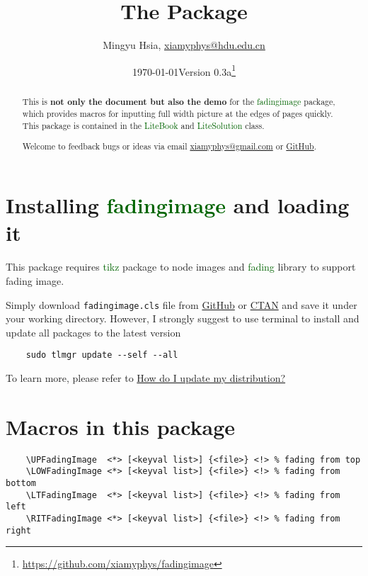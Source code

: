 \documentclass[11pt,svgnames]{article}
\title{\bfseries The \pkg{fadingimage} Package}
\author{Mingyu Hsia, \href{mailto:xiamyphys@hdu.edu.cn}{\ttfamily xiamyphys@hdu.edu.cn}}
\affil{Hangzhou Dianzi University}
\date{\today\quad Version 0.3a\thanks{\url{https://github.com/xiamyphys/fadingimage}}}
\def\pkg#1{\textcolor{DarkGreen}{\textsf{#1}}}
\begin{document}
\maketitle
{}

\vspace{-6ex}
\begin{abstract}

This is \textsf{\textbf{not only the document but also the demo}} for the \pkg{fadingimage} package, which provides macros for inputting full width picture at the edges of pages quickly. This package is contained in the \pkg{LiteBook} and \pkg{LiteSolution} class.

Welcome to feedback bugs or ideas via email \href{mailto:xiamyphys@gmail.com}{\ttfamily xiamyphys@gmail.com} or \href{https://github.com/xiamyphys/fadingimage}{GitHub}.

\end{abstract}

\section{Installing \pkg{fadingimage} and loading it}

This package requires \pkg{tikz} package to node images and \pkg{fading} library to support fading image.

Simply download \verb|fadingimage.cls| file from \href{https://github.com/xiamyphys/fadingimage}{GitHub} or \href{https://ctan.org/pkg/fadingimage}{CTAN} and save it under your working directory. However, I strongly suggest to use terminal to install and update all packages to the latest version

\begin{verbatim}
    sudo tlmgr update --self --all
\end{verbatim}

To learn more, please refer to \href{https://tex.stackexchange.com/questions/55437/how-do-i-update-my-tex-distribution}{How do I update my  distribution?}

\section{Macros in this package}

\begin{verbatim}
    \UPFadingImage  <*> [<keyval list>] {<file>} <!> % fading from top
    \LOWFadingImage <*> [<keyval list>] {<file>} <!> % fading from bottom
    \LTFadingImage  <*> [<keyval list>] {<file>} <!> % fading from left
    \RITFadingImage <*> [<keyval list>] {<file>} <!> % fading from right
\end{verbatim}
\end{document}
